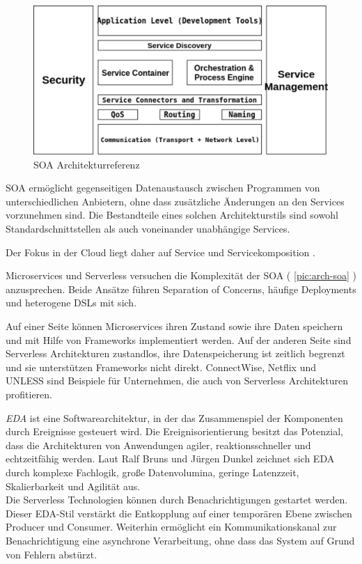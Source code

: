 \documentclass[
12pt,
english,
ngerman,
headsepline,
twoside,
openright,
numbers=noenddot,version=first
]{scrreprt}
\begin{document}
\begin{figure}[h]
	\centering	
	\includegraphics[scale=0.80]{./pics/arch-soa.eps}
	\caption{SOA Architekturreferenz\cite{archSoa}}
	\label{pic:arch-soa}
\end{figure}


SOA ermöglicht gegenseitigen Datenaustausch zwischen Programmen von unterschiedlichen Anbietern, ohne dass zusätzliche Änderungen an den Services vorzunehmen sind. Die Bestandteile eines solchen Architekturstils sind sowohl Standardschnittstellen als auch voneinander unabhängige Services\cite{archSoa}. 

Der Fokus in der Cloud liegt daher auf Service und Servicekomposition \cite{cloudEssentials}.

Microservices und Serverless versuchen die Komplexität der SOA ( \autoref{pic:arch-soa} ) anzusprechen. Beide Ansätze führen  Separation of Concerns, häufige Deployments und heterogene \acrfull{DSL}s mit sich.\cite{microAdv}

Auf einer Seite können Microservices ihren Zustand sowie ihre Daten speichern und mit Hilfe von Frameworks implementiert werden. Auf der anderen Seite sind Serverless Architekturen zustandlos, ihre Datenspeicherung ist zeitlich begrenzt und sie unterstützen Frameworks nicht direkt. ConnectWise\cite{ConnectWise}, Netflix\cite{Netflix} und UNLESS\cite{UNLESS} sind Beispiele für Unternehmen, die auch von Serverless Architekturen profitieren.


\textit{\acrfull{EDA}}\label{sec:eda} ist eine Softwarearchitektur, in der das Zusammenspiel der Komponenten durch Ereignisse gesteuert wird. Die Ereignisorientierung besitzt das Potenzial, dass die Architekturen von Anwendungen agiler, reaktionsschneller und
echtzeitfähig werden. Laut Ralf Bruns und Jürgen Dunkel zeichnet sich \acrshort{EDA} durch komplexe Fachlogik, große Datenvolumina, geringe Latenzzeit, Skalierbarkeit und Agilität aus.\cite{archEDA}\\
Die Serverless Technologien können durch Benachrichtigungen gestartet werden. Dieser \acrshort{EDA}-Stil verstärkt die Entkopplung auf einer temporären Ebene zwischen Producer und Consumer. Weiterhin ermöglicht ein Kommunikationskanal zur Benachrichtigung eine asynchrone Verarbeitung, ohne dass das System auf Grund von Fehlern abstürzt. \cite{patternIntegrationEnterprise}
\end{document}
